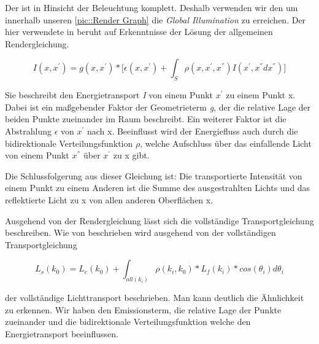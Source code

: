 \par 

Der  ist in Hinsicht der Beleuchtung komplett. 
Deshalb verwenden wir den  um innerhalb unseren 
\ref{pic::Render Graph} die \textit{Global Illumination} zu erreichen. Der hier verwendete  in 
\cite{Benty18} beruht auf Erkenntnisse der Lösung der allgemeinen Rendergleichung.

\begin{equation}\label{eq:Allgemeine Rendergleichung}
    I(x,{x}^{'}) = g(x,{x}^{'}) * \biggl[\epsilon(x,{x}^{'}) + 
    \int_{S}^{} \rho(x,{x}^{'},{x}^{''})
    I({x}^{'},{x}^{''}d{x}^{''})\biggr] 
\end{equation}

Sie beschreibt den Energietransport \textit{I} von einem Punkt ${x}^{'}$
zu einem Punkt x. Dabei ist ein maßgebender Faktor der Geometrieterm \textit{g},
der die relative Lage der beiden Punkte zueinander im Raum beschreibt.
Ein weiterer Faktor ist die Abstrahlung \textit{$\epsilon$} von ${x}^{'}$ nach x. 
Beeinflusst wird der Energiefluss auch durch
die bidirektionale Verteilungsfunktion \textit{$\rho$}, welche Aufschluss über
das einfallende Licht von einem Punkt ${x}^{''}$ über ${x}^{'}$ zu x gibt.\par
Die Schlussfolgerung aus dieser Gleichung  ist: Die transportierte
Intensität von einem Punkt zu einem Anderen ist die Summe des ausgestrahlten Lichts 
und das reflektierte Licht zu x von allen anderen Oberflächen x.

Ausgehend von der Rendergleichung  lässt sich
die vollständige Transportgleichung
beschreiben.
Wie von \cite{marschner2009fundamentals} beschrieben wird ausgehend von der vollständigen Transportgleichung

\begin{equation}\label{eq:vollständige Transportgleichung}
    L_s(k_0) = L_e(k_0) + \int_{all(k_i)}^{} \rho(k_i, k_0)*L_f(k_i)*cos(\theta_i)d\theta_i
\end{equation}

der vollständige Lichttransport beschrieben. Man kann deutlich die Ähnlichkeit
zu  erkennen. Wir haben den Emissionsterm, die relative Lage der 
Punkte zueinander und die bidirektionale Verteilungsfunktion welche den Energietransport
beeinflussen.


